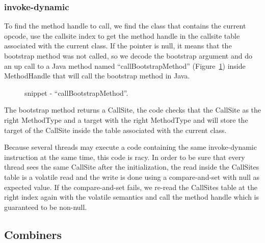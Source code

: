 \documentclass{sig-alternate}
\begin{document}
    \subsubsection{invoke-dynamic}
      To find the method handle to call, we find the class that contains the current opcode,
      use the callsite index to get the method handle
      in the callsite table associated with the current class.
      If the pointer is null, it means that the bootstrap method was not called,
      so we decode the bootstrap argument and do an up call to a Java method named ``callBootstrapMethod'' (Figure~\ref{implBSM})
      inside MethodHandle that will call the bootstrap method in Java.
      
      \begin{figure}[!ht]
        \centering \vspace{-1.5em}
        \caption{snippet - ``callBootstrapMethod''.}\vspace{-1em}
        \label{implBSM}
      \end{figure}

      The bootstrap method returns a CallSite, the code checks that the CallSite as the right MethodType
      and a target with the right MethodType and will store the target of the CallSite inside the table
      associated with the current class.

      Because several threads may execute a code containing the same invoke-dynamic instruction
      at the same time, this code is racy. In order to be sure that every thread sees the same CallSite
      after the initialization, the read inside the CallSites table is a volatile read and the write
      is done using a compare-and-set with null as expected value.
      If the compare-and-set fails, we re-read the CallSites table at the right index again with the volatile semantics
      and call the method handle which is guaranteed to be non-null.   



    \subsection{Combiners}
    \label{combiners}
\end{document}
